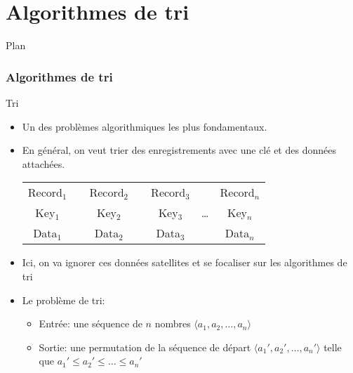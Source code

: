 
\part{Algorithmes de tri}


\begin{frame}{Plan}

\tableofcontents

\end{frame}

\section{Algorithmes de tri}

\begin{frame}{Tri}

\begin{itemize}
\item Un des problèmes algorithmiques les plus fondamentaux.
\item En général, on veut trier des enregistrements avec une clé et des
  données attachées.
\medskip
\begin{center}
\begin{tabular}{ccccccc}
Record$_1$ & & Record$_2$ & & Record$_3$ & & Record$_n$\\
\cline{1-1} \cline{3-3} \cline{5-5} \cline{7-7}
\multicolumn{1}{|c|}{Key$_1$} & & \multicolumn{1}{|c|}{Key$_2$} & & \multicolumn{1}{|c|}{Key$_3$} & \ldots & \multicolumn{1}{|c|}{Key$_n$}\\
 \cline{1-1} \cline{3-3} \cline{5-5} \cline{7-7}
\multicolumn{1}{|c|}{Data$_1$} & & \multicolumn{1}{|c|}{Data$_2$} & & \multicolumn{1}{|c|}{Data$_3$} & & \multicolumn{1}{|c|}{Data$_n$}\\
 \cline{1-1} \cline{3-3} \cline{5-5} \cline{7-7}
\end{tabular}
\end{center}
\medskip
\item Ici, on va ignorer ces données satellites et se focaliser sur
  les algorithmes de tri

\bigskip

\item Le problème de tri:
\begin{itemize}
\item Entrée: une séquence de $n$ nombres $\langle a_1,a_2,\ldots,a_n\rangle$
\item Sortie: une permutation de la séquence de départ $\langle a_1',a_2',\ldots,a_n'\rangle$ telle que $a_1'\leq a_2'\leq\ldots\leq a_n'$
\end{itemize}
\end{itemize}

\end{frame}

